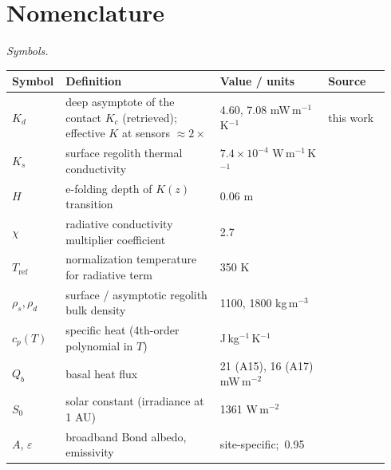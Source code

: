\documentclass[11pt]{article}
\renewcommand{\arraystretch}{1.15}
\begin{document}
\section*{Nomenclature}
\label{sec:nomenclature}
{\small
\setlength{\tabcolsep}{4pt}
\renewcommand{\arraystretch}{1.0}

\noindent\textit{Symbols.}\par\smallskip\noindent
\begin{tabular}{@{}p{0.10\linewidth}p{0.40\linewidth}p{0.28\linewidth}p{0.16\linewidth}@{}}
\toprule
\textbf{Symbol} & \textbf{Definition} & \textbf{Value / units} & \textbf{Source} \\
\midrule
$K_d$              & deep asymptote of the contact $K_c$ (retrieved); effective $K$ at sensors ${\approx}2\times$        & 4.60, 7.08 mW\,m$^{-1}$\,K$^{-1}$         & this work \\
$K_s$              & surface regolith thermal conductivity                  & $7.4\times10^{-4}$ W\,m$^{-1}$\,K$^{-1}$  & \citet{hayne2017} \\
$H$                & e-folding depth of $K(z)$ transition                  & 0.06 m                                       & \citet{hayne2017} \\
$\chi$             & radiative conductivity multiplier coefficient         & 2.7                                          & \citet{hayne2017} \\
$T_\mathrm{ref}$   & normalization temperature for radiative term          & 350 K                                        & \citet{hayne2017} \\
$\rho_s,\rho_d$    & surface / asymptotic regolith bulk density                  & 1100, 1800 kg\,m$^{-3}$                      & \citet{hayne2017} \\
$c_p(T)$           & specific heat (4th-order polynomial in $T$)           & J\,kg$^{-1}$\,K$^{-1}$                       & \citet{hemingway1973,hayne2017} \\
$Q_b$              & basal heat flux                                       & 21 (A15), 16 (A17) mW\,m$^{-2}$              & \citet{langseth1976,nagihara2018} \\
$S_0$              & solar constant (irradiance at 1 AU)                   & 1361 W\,m$^{-2}$                             & \citet{kopp2011} \\
$A$, $\varepsilon$ & broadband Bond albedo, emissivity                     & site-specific;\ 0.95                         & \citet{vasavada2012,bandfield2015} \\

\end{tabular}}
\end{document}
